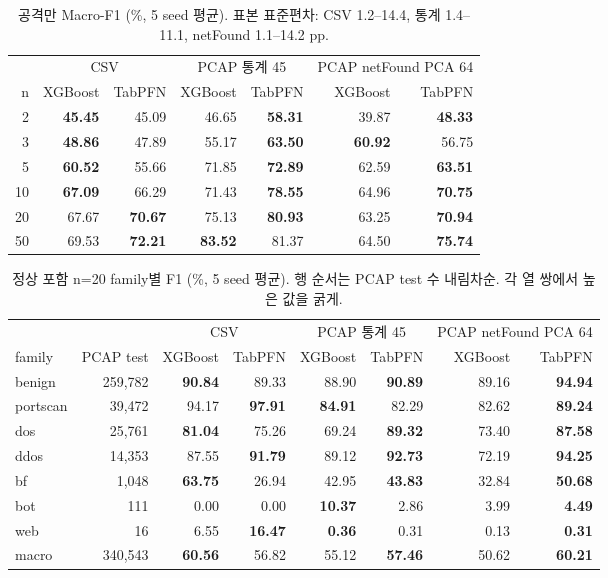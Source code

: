 \begin{table}[H]
\centering\small
\caption{공격만 Macro-F1 (\%, 5 seed 평균). 표본 표준편차: CSV 1.2--14.4, 통계 1.4--11.1, netFound 1.1--14.2 pp.}
\begin{tabular}{r|rr|rr|rr}
\toprule & \multicolumn{2}{c|}{CSV} & \multicolumn{2}{c|}{PCAP 통계 45} & \multicolumn{2}{c}{PCAP netFound PCA 64}\\
n & XGBoost & TabPFN & XGBoost & TabPFN & XGBoost & TabPFN\\\midrule
2  & \textbf{45.45} & 45.09 & 46.65 & \textbf{58.31} & 39.87 & \textbf{48.33}\\
3  & \textbf{48.86} & 47.89 & 55.17 & \textbf{63.50} & \textbf{60.92} & 56.75\\
5  & \textbf{60.52} & 55.66 & 71.85 & \textbf{72.89} & 62.59 & \textbf{63.51}\\
10 & \textbf{67.09} & 66.29 & 71.43 & \textbf{78.55} & 64.96 & \textbf{70.75}\\
20 & 67.67 & \textbf{70.67} & 75.13 & \textbf{80.93} & 63.25 & \textbf{70.94}\\
50 & 69.53 & \textbf{72.21} & \textbf{83.52} & 81.37 & 64.50 & \textbf{75.74}\\
\bottomrule
\end{tabular}
\end{table}

\begin{table}[H]
\centering\small
\caption{정상 포함 n=20 family별 F1 (\%, 5 seed 평균). 행 순서는 PCAP test 수 내림차순. 각 열 쌍에서 높은 값을 굵게.}
\begin{tabular}{lr|rr|rr|rr}
\toprule & & \multicolumn{2}{c|}{CSV} & \multicolumn{2}{c|}{PCAP 통계 45} & \multicolumn{2}{c}{PCAP netFound PCA 64}\\
family & PCAP test & XGBoost & TabPFN & XGBoost & TabPFN & XGBoost & TabPFN\\\midrule
benign & 259,782 & \textbf{90.84} & 89.33 & 88.90 & \textbf{90.89} & 89.16 & \textbf{94.94}\\
portscan & 39,472 & 94.17 & \textbf{97.91} & \textbf{84.91} & 82.29 & 82.62 & \textbf{89.24}\\
dos & 25,761 & \textbf{81.04} & 75.26 & 69.24 & \textbf{89.32} & 73.40 & \textbf{87.58}\\
ddos & 14,353 & 87.55 & \textbf{91.79} & 89.12 & \textbf{92.73} & 72.19 & \textbf{94.25}\\
bf & 1,048 & \textbf{63.75} & 26.94 & 42.95 & \textbf{43.83} & 32.84 & \textbf{50.68}\\
bot & 111 & 0.00 & 0.00 & \textbf{10.37} & 2.86 & 3.99 & \textbf{4.49}\\
web & 16 & 6.55 & \textbf{16.47} & \textbf{0.36} & 0.31 & 0.13 & \textbf{0.31}\\\midrule
macro & 340,543 & \textbf{60.56} & 56.82 & 55.12 & \textbf{57.46} & 50.62 & \textbf{60.21}\\
\bottomrule
\end{tabular}
\end{table}

